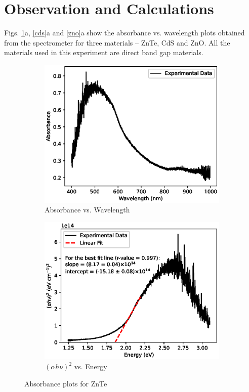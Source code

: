 \section{Observation and Calculations}

Figs. \ref{znte}a, \ref{cds}a and \ref{zno}a show the absorbance vs. wavelength plots obtained from the spectrometer for three materials -- ZnTe, CdS and ZnO. All the materials used in this experiment are direct band gap materials.

\begin{figure}
    \begin{subfigure}{\linewidth}
    \includegraphics[width=1\textwidth]{images/znteA.eps}
    \caption{Absorbance vs. Wavelength}
    \end{subfigure}
    
    \begin{subfigure}{\linewidth}
    \includegraphics[width=1\textwidth]{images/znte.eps}
    \caption{$(\alpha h \nu)^2$ vs. Energy}
    \end{subfigure}
    \caption{Absorbance plots for ZnTe}
    \label{znte}
\end{figure}

